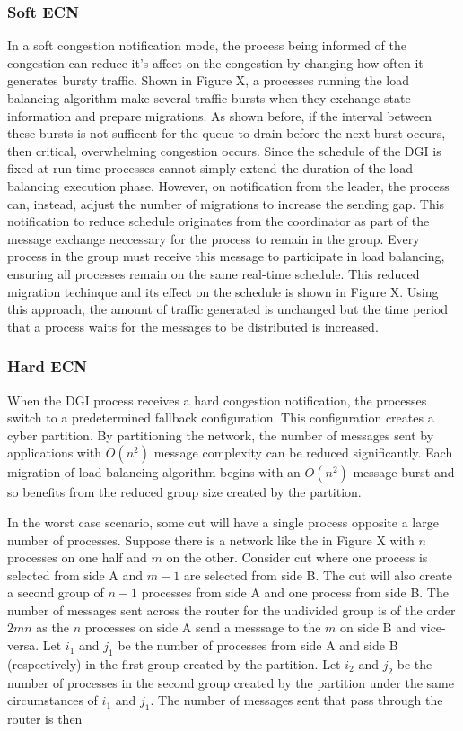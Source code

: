 \subsubsection{Soft ECN}

In a soft congestion notification mode, the process being informed of the congestion can reduce it's affect on the congestion by changing how often it generates bursty traffic.
Shown in Figure X, a processes running the load balancing algorithm make several traffic bursts when they exchange state information and prepare migrations.
As shown before, if the interval between these bursts is not sufficent for the queue to drain before the next burst occurs, then critical, overwhelming congestion occurs.
Since the schedule of the DGI is fixed at run-time processes cannot simply extend the duration of the load balancing execution phase.
However, on notification from the leader, the process can, instead, adjust the number of migrations to increase the sending gap.
This notification to reduce schedule originates from the coordinator as part of the message exchange neccessary for the process to remain in the group.
Every process in the group must receive this message to participate in load balancing, ensuring all processes remain on the same real-time schedule.
This reduced migration techinque and its effect on the schedule is shown in Figure X.
Using this approach, the amount of traffic generated is unchanged but the time period that a process waits for the messages to be distributed is increased.

\subsubsection{Hard ECN}

When the DGI process receives a hard congestion notification, the processes switch to a predetermined fallback configuration.
This configuration creates a cyber partition.
By partitioning the network, the number of messages sent by applications with $O(n^2)$ message complexity can be reduced significantly.
Each migration of load balancing algorithm begins with an $O(n^2)$ message burst and so benefits from the reduced group size created by the partition.

In the worst case scenario, some cut will have a single process opposite a large number of processes.
Suppose there is a network like the in Figure X with $n$ processes on one half and $m$ on the other.
Consider cut where one process is selected from side A and $m-1$ are selected from side B.
The cut will also create a second group of $n-1$ processes from side A and one process from side B.
The number of messages sent across the router for the undivided group is of the order $2mn$ as the $n$ processes on side A send a messsage to the $m$ on side B and vice-versa.
Let $i_{1}$ and $j_{1}$ be the number of processes from side A and side B (respectively) in the first group created by the partition.
Let $i_{2}$ and $j_{2}$ be the number of processes in the second group created by the partition under the same circumstances of $i_1$ and $j_1$.
The number of messages sent that pass through the router is then 

